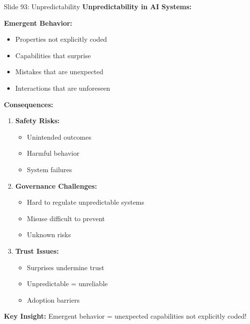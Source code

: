\documentclass[8pt]{beamer}
\begin{document}
	\begin{frame}{Slide 93: Unpredictability}
		\fontsize{6.5}{7.5}\selectfont
		\textbf{Unpredictability in AI Systems:}
		
		\vspace{0.1cm}
		\textbf{Emergent Behavior:}
		\begin{itemize}
			\item Properties not explicitly coded
			\item Capabilities that surprise
			\item Mistakes that are unexpected
			\item Interactions that are unforeseen
		\end{itemize}
		
		\vspace{0.1cm}
		\textbf{Consequences:}
		\begin{enumerate}
			\item \textbf{Safety Risks:}
			\begin{itemize}
				\item Unintended outcomes
				\item Harmful behavior
				\item System failures
			\end{itemize}
			\item \textbf{Governance Challenges:}
			\begin{itemize}
				\item Hard to regulate unpredictable systems
				\item Misuse difficult to prevent
				\item Unknown risks
			\end{itemize}
			\item \textbf{Trust Issues:}
			\begin{itemize}
				\item Surprises undermine trust
				\item Unpredictable = unreliable
				\item Adoption barriers
			\end{itemize}
		\end{enumerate}
		
		\textcolor{myblue}{\textbf{Key Insight:}} Emergent behavior = \textcolor{myblue}{unexpected capabilities not explicitly coded}!
	\end{frame}
	
\end{document}
